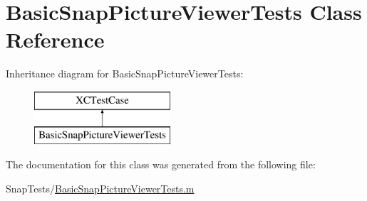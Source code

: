 \hypertarget{interface_basic_snap_picture_viewer_tests}{}\section{Basic\+Snap\+Picture\+Viewer\+Tests Class Reference}
\label{interface_basic_snap_picture_viewer_tests}
Inheritance diagram for Basic\+Snap\+Picture\+Viewer\+Tests\+:\begin{figure}[H]
\begin{center}
\leavevmode
\includegraphics[height=2.000000cm]{interface_basic_snap_picture_viewer_tests}
\end{center}
\end{figure}


The documentation for this class was generated from the following file\+:\begin{DoxyCompactItemize}
\item 
Snap\+Tests/\hyperlink{_basic_snap_picture_viewer_tests_8m}{Basic\+Snap\+Picture\+Viewer\+Tests.\+m}\end{DoxyCompactItemize}
